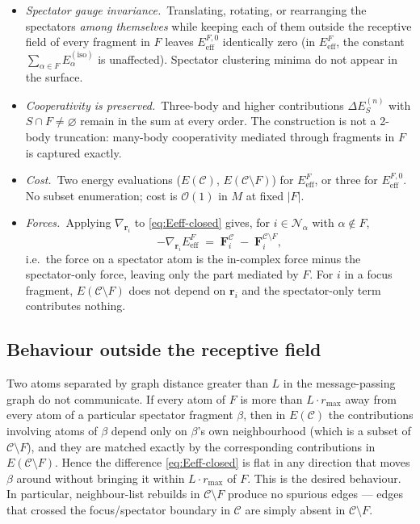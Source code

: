 \documentclass[11pt,a4paper]{article}
\newcommand{\Eiso}{E^{(\mathrm{iso})}}
\newcommand{\rmax}{r_{\mathrm{max}}}
\begin{document}
\begin{itemize}[leftmargin=1.4em]
\item \emph{Spectator gauge invariance.}\, Translating, rotating, or rearranging
the spectators \emph{among themselves} while keeping each of them outside the
receptive field of every fragment in $F$ leaves $E_{\mathrm{eff}}^{F,0}$
identically zero (in $E_{\mathrm{eff}}^{F}$, the constant
$\sum_{\alpha \in F}\Eiso_\alpha$ is unaffected). Spectator clustering minima
do not appear in the surface.

\item \emph{Cooperativity is preserved.}\, Three-body and higher contributions
$\Delta E^{(n)}_{S}$ with $S \cap F \ne \varnothing$ remain in the sum at every
order. The construction is not a 2-body truncation: many-body cooperativity
mediated through fragments in $F$ is captured exactly.

\item \emph{Cost.}\, Two energy evaluations
($E(\mathcal{C})$, $E(\mathcal{C}\setminus F)$) for $E_{\mathrm{eff}}^{F}$, or
three for $E_{\mathrm{eff}}^{F,0}$. No subset enumeration; cost is
$\mathcal{O}(1)$ in $M$ at fixed $|F|$.

\item \emph{Forces.}\, Applying $\nabla_{\mathbf r_i}$ to
\cref{eq:Eeff-closed} gives, for $i \in \mathcal{N}_\alpha$ with
$\alpha \notin F$,
\[
-\nabla_{\mathbf r_i} E_{\mathrm{eff}}^{F}
\;=\; \mathbf F^{\mathcal{C}}_i \;-\; \mathbf F^{\mathcal{C}\setminus F}_i,
\]
i.e.\ the force on a spectator atom is the in-complex force minus the
spectator-only force, leaving only the part mediated by $F$. For $i$ in a
focus fragment, $E(\mathcal{C}\setminus F)$ does not depend on $\mathbf r_i$
and the spectator-only term contributes nothing.
\end{itemize}

\subsection{Behaviour outside the receptive field}

Two atoms separated by graph distance greater than $L$ in the message-passing
graph do not communicate. If every atom of $F$ is more than $L \cdot \rmax$
away from every atom of a particular spectator fragment $\beta$, then in
$E(\mathcal{C})$ the contributions involving atoms of $\beta$ depend only on
$\beta$'s own neighbourhood (which is a subset of $\mathcal{C}\setminus F$),
and they are matched exactly by the corresponding contributions in
$E(\mathcal{C}\setminus F)$. Hence the difference \cref{eq:Eeff-closed} is
flat in any direction that moves $\beta$ around without bringing it within
$L \cdot \rmax$ of $F$. This is the desired behaviour. In particular,
neighbour-list rebuilds in $\mathcal{C}\setminus F$ produce no spurious
edges --- edges that crossed the focus/spectator boundary in $\mathcal{C}$
are simply absent in $\mathcal{C}\setminus F$.
\end{document}
